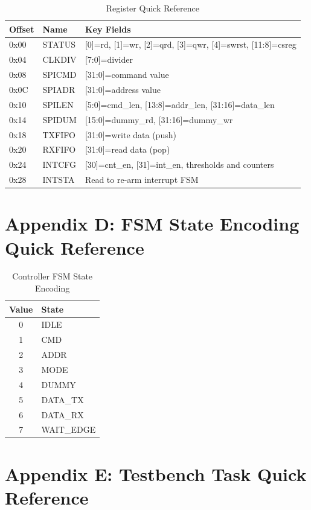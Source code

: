 \begin{table}[H]
\centering
\caption{Register Quick Reference}
\label{tab:reg_quick}
\small
\begin{tabular}{@{}lll@{}}
\toprule
\textbf{Offset} & \textbf{Name} & \textbf{Key Fields} \\
\midrule
0x00 & STATUS  & [0]=rd, [1]=wr, [2]=qrd, [3]=qwr, [4]=swrst, [11:8]=csreg \\
0x04 & CLKDIV  & [7:0]=divider \\
0x08 & SPICMD  & [31:0]=command value \\
0x0C & SPIADR  & [31:0]=address value \\
0x10 & SPILEN  & [5:0]=cmd\_len, [13:8]=addr\_len, [31:16]=data\_len \\
0x14 & SPIDUM  & [15:0]=dummy\_rd, [31:16]=dummy\_wr \\
0x18 & TXFIFO  & [31:0]=write data (push) \\
0x20 & RXFIFO  & [31:0]=read data (pop) \\
0x24 & INTCFG  & [30]=cnt\_en, [31]=int\_en, thresholds and counters \\
0x28 & INTSTA  & Read to re-arm interrupt FSM \\
\bottomrule
\end{tabular}
\end{table}

\section{Appendix D: FSM State Encoding Quick Reference}

\begin{table}[H]
\centering
\caption{Controller FSM State Encoding}
\begin{tabular}{@{}cl@{}}
\toprule
\textbf{Value} & \textbf{State} \\
\midrule
0 & IDLE \\
1 & CMD \\
2 & ADDR \\
3 & MODE \\
4 & DUMMY \\
5 & DATA\_TX \\
6 & DATA\_RX \\
7 & WAIT\_EDGE \\
\bottomrule
\end{tabular}
\end{table}

\section{Appendix E: Testbench Task Quick Reference}

